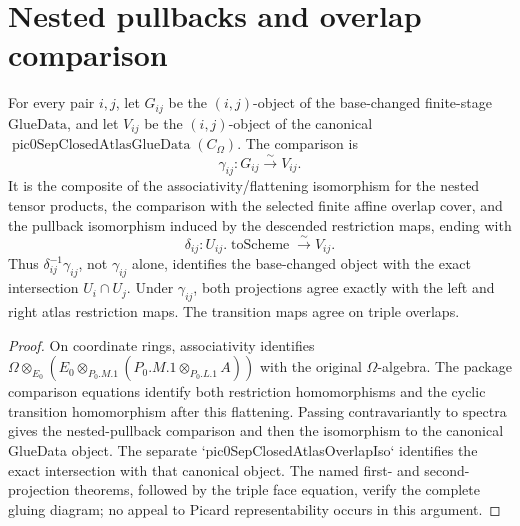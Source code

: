 \section{Nested pullbacks and overlap comparison}

\begin{theorem}
  \label{route-thm-overlap-comparison}

  For every pair \(i,j\), let \(G_{ij}\) be the \((i,j)\)-object of the
  base-changed finite-stage \(\mathrm{GlueData}\), and let \(V_{ij}\) be the
  \((i,j)\)-object of the canonical
  \(\operatorname{pic0SepClosedAtlasGlueData}(C_\Omega)\).  The comparison is
  \[
    \gamma_{ij}:G_{ij}\xrightarrow{\sim}V_{ij}.
  \]
  It is the composite of
  the associativity/flattening isomorphism for the nested tensor products,
  the comparison with the selected finite affine overlap cover, and the
  pullback isomorphism induced by the descended restriction maps, ending with
  \[
    \delta_{ij}:U_{ij}.\operatorname{toScheme}\xrightarrow{\sim}V_{ij}.
  \]
  Thus \(\delta_{ij}^{-1}\gamma_{ij}\), not \(\gamma_{ij}\) alone, identifies
  the base-changed object with the exact intersection \(U_i\cap U_j\).  Under
  \(\gamma_{ij}\),
  both projections agree exactly with the left and right atlas restriction
  maps.  The transition maps agree on triple overlaps.
\end{theorem}

\begin{proof}
  On coordinate rings, associativity identifies
  \(\Omega\otimes_{E_0}
    (E_0\otimes_{P_0.M.1}(P_0.M.1\otimes_{P_0.L.1}A))\) with the original
  \(\Omega\)-algebra.  The package comparison equations identify both
  restriction homomorphisms and the cyclic transition homomorphism after this
  flattening.  Passing contravariantly to spectra gives the nested-pullback
  comparison and then the isomorphism to the canonical GlueData object.  The
  separate `pic0SepClosedAtlasOverlapIso` identifies the exact intersection
  with that canonical object.  The named first- and second-projection theorems,
  followed by the triple face equation, verify the complete gluing diagram;
  no appeal to Picard representability occurs in this argument.
\end{proof}

